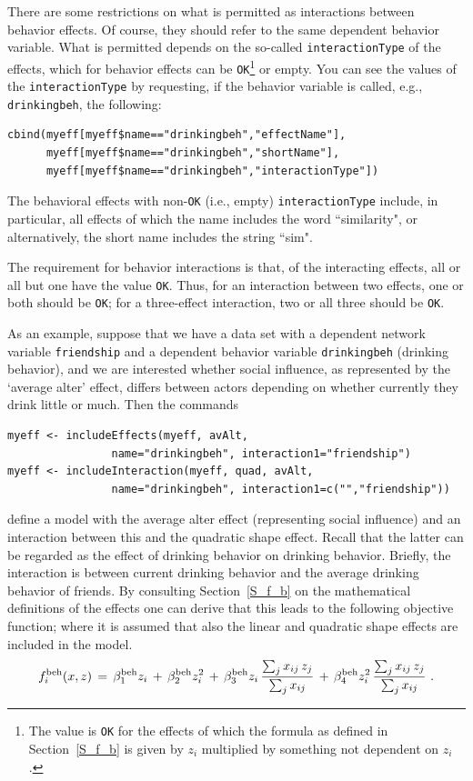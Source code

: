 \documentclass[a4paper,fleqn,11pt]{article}
\newcommand{\+}{\, + \,}
\begin{document}
There are some restrictions on what is permitted
as interactions between behavior effects.
Of course,  they should refer to the same dependent behavior variable.
What is permitted depends on the so-called \texttt{interactionType} of the
effects, which for behavior effects can be \texttt{OK}\footnote{The value
is \texttt{OK} for the effects of which the
formula as defined in Section~\ref{S_f_b}
is given by $z_i$ multiplied by something not dependent on $z_i$.}
or empty.
You can see the values of the \texttt{interactionType} by requesting,
if the behavior variable is called, e.g., \texttt{drinkingbeh}, the following:
\begin{verbatim}
cbind(myeff[myeff$name=="drinkingbeh","effectName"],
      myeff[myeff$name=="drinkingbeh","shortName"],
      myeff[myeff$name=="drinkingbeh","interactionType"])
\end{verbatim}
The behavioral effects with non-\texttt{OK} (i.e., empty)
\texttt{interactionType} include,
in particular, all effects of which the name
includes the word ``similarity",
or alternatively, the short name includes the string ``sim".

The requirement for behavior interactions is that,
of the interacting effects, all or all but one have
the value \texttt{OK}. Thus, for an interaction between two effects,
one or both should be \texttt{OK}; for a three-effect interaction,
two or all three should be \texttt{OK}.

As an example, suppose that we have a data set with a dependent
network variable \texttt{friendship} and a dependent behavior variable
\texttt{drinkingbeh} (drinking behavior), and we are interested whether
social influence, as represented by the `average alter' effect, differs
between actors depending on whether currently they drink little or much.
Then the commands
\begin{verbatim}
myeff <- includeEffects(myeff, avAlt,
                name="drinkingbeh", interaction1="friendship")
myeff <- includeInteraction(myeff, quad, avAlt,
                name="drinkingbeh", interaction1=c("","friendship"))
\end{verbatim}
define a model with the average alter effect (representing social influence)
and an interaction between this and the quadratic shape effect.
Recall that the latter can be regarded
as the effect of drinking behavior on drinking behavior.
Briefly, the interaction is between current drinking behavior
and the average drinking behavior of friends.
By consulting Section~\ref{S_f_b} on the mathematical definitions of the
effects one can derive that this leads to the following objective function;
where it is assumed that also the linear and quadratic shape effects are
included in the model.
\[
f^{\rm beh}_i(x, z) \,=\, \beta^{\rm beh}_1 z_i \,+\, \beta^{\rm beh}_2 z_i^2
        \,+\, \beta^{\rm beh}_3 z_i \,
        \frac{ \sum_j x_{ij}\, z_j }{\sum_j x_{ij}}
       \,+\, \beta^{\rm beh}_4 z_i^2 \,
              \frac{ \sum_j x_{ij}\, z_j }{\sum_j x_{ij}} \ .
\]
\medskip
\end{document}
